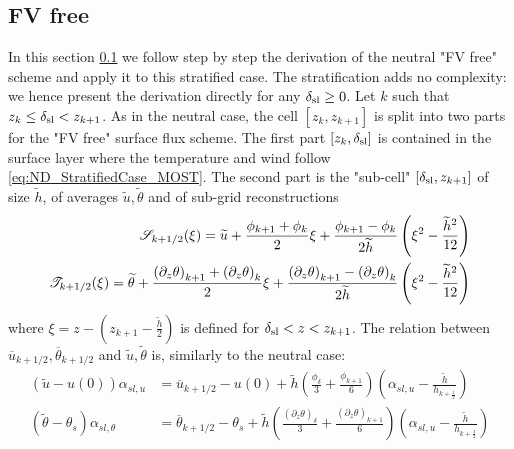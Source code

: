 \subsection{FV free}
\label{sec:ND_StratifiedCase_FVfree}
In this section \ref{sec:ND_StratifiedCase_FVfree} we follow
step by step the derivation of the neutral "FV free" scheme and
apply it to this stratified case. The stratification adds no
complexity: we hence present the derivation directly for
any $\delta_{\rm sl} \geq 0$.
Let $k$ such that $z_k \leq \delta_{\rm sl} < z_{k+1}$.
As in the neutral case, the cell $[z_k, z_{k+1}]$ is split
into two parts for the "FV free" surface flux scheme.
The first part $[z_k,\delta_{\rm sl}]$ is contained
in the surface layer where the temperature and wind
follow \eqref{eq:ND_StratifiedCase_MOST}.
The second part is the
"sub-cell" $[\delta_{\rm sl}, z_{k+1}]$ of size $\widetilde{h}$, of
averages $\widetilde{u}, \widetilde{\theta}$
and of sub-grid reconstructions
\begin{equation}
\begin{aligned}
{\cal S}_{k+1/2}(\xi) = \widetilde{u} +
	\frac{\phi_{k+1} + \phi_{k}}{2} \xi
+ \frac{\phi_{k+1} - \phi_{k}}{2\widetilde{h}}
	\left(\xi^2 - \frac{\widetilde{h}^2}{12}\right) \\
{\cal T}_{k+1/2}(\xi) = \widetilde{\theta} +
	\frac{{(\partial_z \theta)}_{k+1} + 
		{(\partial_z \theta)}_{k}}{2} \xi
+ \frac{{(\partial_z \theta)}_{k+1} - {(\partial_z \theta)}_{k}}
	{2\widetilde{h}}
	\left(\xi^2 - \frac{\widetilde{h}^2}{12}\right)
\end{aligned}
\end{equation}
where $\xi = z - (z_{k+1} - \frac{\widetilde{h}}{2})$ is defined
for $\delta_{\rm sl} < z < z_{k+1}$.
The relation between
$\overline{u}_{k+1/2}, \overline{\theta}_{k+1/2}$ and
$\widetilde{u},\widetilde{\theta}$ is, similarly to the neutral case:
\begin{equation}
\begin{aligned}
\label{eq:ND_StratifiedCase_relation_tilde_bar}
	\left(\widetilde{u} - u(0)\right)\alpha_{sl, u}
	&= \overline{u}_{k+1/2} - u(0) + \widetilde{h}
	\left(\frac{\phi_\delta}{3} + \frac{\phi_{k+1}}{6}\right)
	\left(\alpha_{sl, u} -
	\frac{\widetilde{h}}{h_{k+\frac{1}{2}}}
	\right)\\
	\left(\widetilde{\theta} - \theta_s\right)
	\alpha_{sl, \theta}
	&= \overline{\theta}_{k+1/2} - \theta_s +
	\widetilde{h}\left(
		\frac{{(\partial_z \theta)}_\delta}{3} +
		\frac{{(\partial_z \theta)}_{k+1}}{6}
	\right)\left(\alpha_{sl, u} -
	\frac{\widetilde{h}}{h_{k+\frac{1}{2}}}
	\right)
\end{aligned}
\end{equation}
